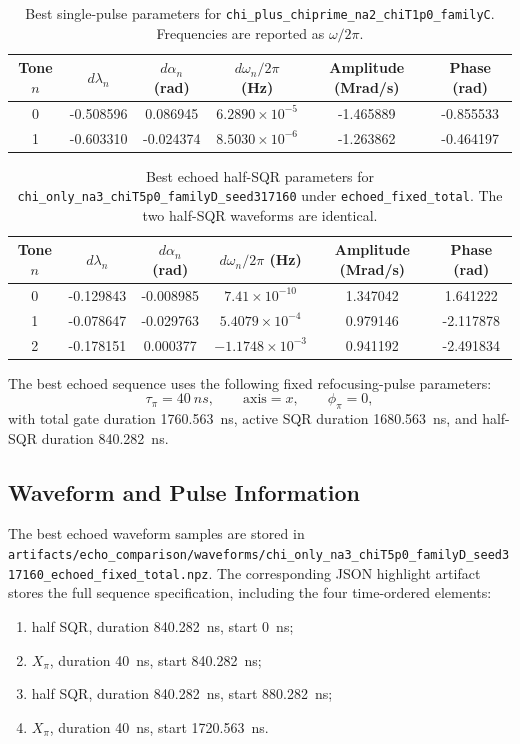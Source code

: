 \documentclass[aps,pra,twocolumn,reprint,floatfix,amsmath,amssymb]{revtex4-2}
\begin{document}
\begin{table}[t]
  \centering
  \caption{Best single-pulse parameters for \texttt{chi\_plus\_chiprime\_na2\_chiT1p0\_familyC}. Frequencies are reported as \(\omega/2\pi\).}
  \begin{tabular}{@{}cccccc@{}}
    \toprule
    Tone $n$ & $d\lambda_n$ & $d\alpha_n$ (rad) & $d\omega_n/2\pi$ (Hz) & Amplitude (Mrad/s) & Phase (rad) \\
    \midrule
    0 & -0.508596 & 0.086945 & $6.2890\times 10^{-5}$ & -1.465889 & -0.855533 \\
    1 & -0.603310 & -0.024374 & $8.5030\times 10^{-6}$ & -1.263862 & -0.464197 \\
    \bottomrule
  \end{tabular}
  \label{tab:best-single-params}
\end{table}

\begin{table}[t]
  \centering
  \caption{Best echoed half-SQR parameters for \texttt{chi\_only\_na3\_chiT5p0\_familyD\_seed317160} under \texttt{echoed\_fixed\_total}. The two half-SQR waveforms are identical.}
  \begin{tabular}{@{}cccccc@{}}
    \toprule
    Tone $n$ & $d\lambda_n$ & $d\alpha_n$ (rad) & $d\omega_n/2\pi$ (Hz) & Amplitude (Mrad/s) & Phase (rad) \\
    \midrule
    0 & -0.129843 & -0.008985 & $7.41\times 10^{-10}$ & 1.347042 & 1.641222 \\
    1 & -0.078647 & -0.029763 & $5.4079\times 10^{-4}$ & 0.979146 & -2.117878 \\
    2 & -0.178151 & 0.000377 & $-1.1748\times 10^{-3}$ & 0.941192 & -2.491834 \\
    \bottomrule
  \end{tabular}
  \label{tab:best-echo-params}
\end{table}

The best echoed sequence uses the following fixed refocusing-pulse parameters:
\[
\tau_\pi = \SI{40}{ns}, \qquad \text{axis}=x, \qquad \phi_\pi = 0,
\]
with total gate duration \SI{1760.563}{ns}, active SQR duration \SI{1680.563}{ns}, and half-SQR duration \SI{840.282}{ns}.

\subsection{Waveform and Pulse Information}
The best echoed waveform samples are stored in \texttt{artifacts/echo\_comparison/waveforms/chi\_only\_na3\_chiT5p0\_familyD\_seed317160\_echoed\_fixed\_total.npz}. The corresponding JSON highlight artifact stores the full sequence specification, including the four time-ordered elements:
\begin{enumerate}
  \item half SQR, duration \SI{840.282}{ns}, start \SI{0}{ns};
  \item \(X_\pi\), duration \SI{40}{ns}, start \SI{840.282}{ns};
  \item half SQR, duration \SI{840.282}{ns}, start \SI{880.282}{ns};
  \item \(X_\pi\), duration \SI{40}{ns}, start \SI{1720.563}{ns}.
\end{enumerate}
\end{document}
